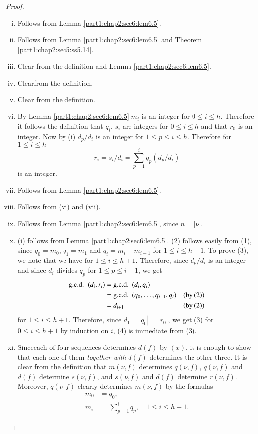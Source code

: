 \begin{proof}
  ~
\begin{enumerate}[(i)]
\item Follows from Lemma \ref{part1:chap2:sec6:lem6.5}.
\item Follows from Lemma \ref{part1:chap2:sec6:lem6.5} and Theorem \ref{part1:chap2:sec5:ss5.14}.
  \item Clear from the definition and Lemma \ref{part1:chap2:sec6:lem6.5}.
    \item Clear\pageoriginale from the definition.
      \item Clear from the definition.
        \item By Lemma \ref{part1:chap2:sec6:lem6.5} $m_i$ is an integer for $0 \leq i \leq h$. Therefore it follows the definition that $q_i$, $s_i$ are integers for $0 \leq i \leq h$ and that $r_0$ is an integer. Now by (i) $d_p/ d_i$ is an integer for $1\leq p \leq i \leq h$. Therefore for $1 \leq i \leq h$
$$
r_i = s_i/d_i = \sum^i_{p=1} q_p (d_p/ d_i)
$$
is an integer.
\item Follows from Lemma \ref{part1:chap2:sec6:lem6.5}.
\item Follows from (vi) and (vii).
  \item Follows from Lemma \ref{part1:chap2:sec6:lem6.5}, since $n=|\nu|$.
    \item (i) follows from Lemma \ref{part1:chap2:sec6:lem6.5}. (2) follows easily from (1), since $q_0= m_0$, $q_1=m_1$ and $q_i = m_i-m_{i-1}$ for $1 \leq i \leq h+1$. To prove (3), we note that we have
for $1 \leq i \leq h+1$. Therefore, since $d_p/d_i$ is an integer and since $d_i$ divides $q_p$ for $1 \leq p \leq i-1$, we get
\begin{align*}
  \text{\gcd}~ (d_i, r_i) & = \text{\gcd}~ (d_i, q_i)& \\
  & = \text{\gcd}~ (q_0, \ldots , q_{i-1}, q_i) & \text{(by (2))}\\
  & = d_{i+1}& \text{(by (2))}
\end{align*}
for $1 \leq i \leq h+1$. Therefore, since $d_1= |q_0| = |r_0|$, we get (3) for $0 \leq i \leq h+1$ by induction on $i$, (4) is immediate from (3).
\item Since\pageoriginale each of four sequences determines $d(f)$ by $(x)$, it is enough to show that each one of them {\em together with} $d(f)$ determines the other three. It is clear from the definition that $m(\nu, f)$ determines $q(\nu, f)$, $q(\nu, f)$ and $d(f)$ determine $s(\nu, f)$, and $s(\nu, f)$ and $d(f)$ determine $r(\nu, f)$. Moreover, $q (\nu, f)$ clearly determines $m(\nu, f)$ by the formulas
\begin{align*}
m_0 & = q_0,\\
m_i & = \sum^i_{p=1} q_p, \quad 1 \leq i \leq h+1.
\end{align*}
\end{enumerate}
\end{proof}

